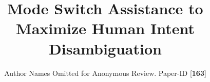 \documentclass[conference]{IEEEtran}
\begin{document}
\title{Mode Switch Assistance to\\Maximize Human Intent Disambiguation}
\author{Author Names Omitted for Anonymous Review. Paper-ID [\textbf{163}]}




% 
%
%
%
%


\maketitle
\end{document}

